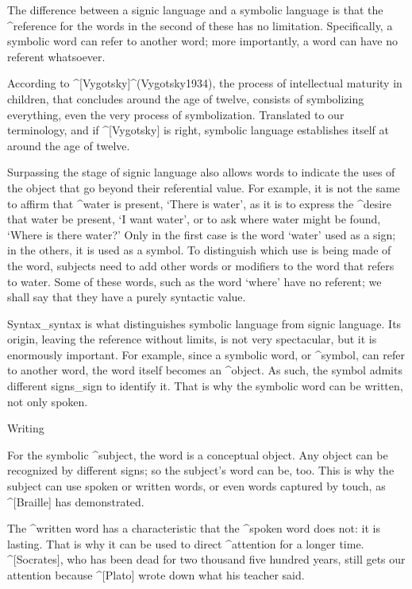 The difference between a signic language and a symbolic language is that
the ^{reference} for the words in the second of these has no limitation.
Specifically, a symbolic word can refer to another word; more
importantly, a word can have no referent whatsoever.

According to ^[Vygotsky]^(Vygotsky1934), the process of intellectual
maturity in children, that concludes around the age of twelve, consists
of symbolizing everything, even the very process of symbolization.
Translated to our terminology, and if ^[Vygotsky] is right, symbolic
language establishes itself at around the age of twelve.

Surpassing the stage of signic language also allows words to indicate
the uses of the object that go beyond their referential value. For
example, it is not the same to affirm that ^{water} is present, `There
is water', as it is to express the ^{desire} that water be present, `I
want water', or to ask where water might be found, `Where is there
water?' Only in the first case is the word `water' used as a sign; in
the others, it is used as a symbol. To distinguish which use is being
made of the word, subjects need to add other words or modifiers to the
word that refers to water. Some of these words, such as the word `where'
have no referent; we shall say that they have a purely syntactic value.

Syntax_{syntax} is what distinguishes symbolic language from signic
language. Its origin, leaving the reference without limits, is not very
spectacular, but it is enormously important. For example, since a
symbolic word, or ^{symbol}, can refer to another word, the word itself
becomes an ^{object}. As such, the symbol admits different signs_{sign}
to identify it. That is why the symbolic word can be written, not only
spoken.


\Section Writing

For the symbolic ^{subject}, the word is a conceptual object. Any object
can be recognized by different signs; so the subject's word can be, too.
This is why the subject can use spoken or written words, or even words
captured by touch, as ^[Braille] has demonstrated.

The ^{written word} has a characteristic that the ^{spoken word} does
not: it is lasting. That is why it can be used to direct ^{attention}
for a longer time. ^[Socrates], who has been dead for two thousand five
hundred years, still gets our attention because ^[Plato] wrote down what
his teacher said.


